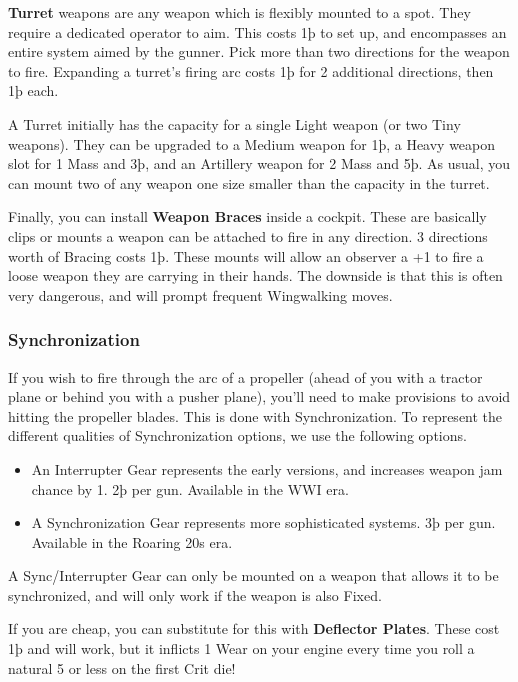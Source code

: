 \documentclass{article}
\begin{document}
\textbf{Turret}{ weapons are any weapon which is flexibly
  mounted to a spot. They require a dedicated operator to aim. This costs
  1þ to set up, and encompasses an entire system aimed by the gunner. Pick
  more than two directions for the weapon to fire. Expanding a turret's
  firing arc costs 1þ for 2 additional directions, then 1þ each.}

A Turret initially has the capacity for a single Light weapon (or
two Tiny weapons). They can be upgraded to a Medium weapon for 1þ, a
Heavy weapon slot for 1 Mass and 3þ, and an Artillery weapon for 2 Mass
and 5þ. As usual, you can mount two of any weapon one size smaller than
the capacity in the turret.

Finally, you can install \textbf{Weapon Braces}
inside a cockpit. These are basically clips or mounts a weapon can be
attached to fire in any direction. 3 directions worth of Bracing costs
1þ. These mounts will allow an observer a +1 to fire a loose weapon they
are carrying in their hands. The downside is that this is often very
dangerous, and will prompt frequent Wingwalking moves.

\subsubsection{Synchronization}
\label{_Synchronization}

If you wish to fire through the arc of a propeller (ahead of you with a
tractor plane or behind you with a pusher plane), you'll need to make
provisions to avoid hitting the propeller blades. This is done with
Synchronization. To represent the different qualities of Synchronization
options, we use the following options.

\begin{itemize}
  \item          An Interrupter Gear represents the early versions, and
        increases weapon jam chance by 1. 2þ per gun. Available in the WWI
        era.
  \item          A Synchronization Gear represents more sophisticated systems.
        3þ per gun. Available in the Roaring 20s era.
\end{itemize}

A Sync/Interrupter Gear can only be mounted on a weapon that allows it
to be synchronized, and will only work if the weapon is also Fixed.

If you are cheap, you can substitute for this with \textbf{Deflector
  Plates}. These cost 1þ and will work, but it inflicts 1 Wear on your
engine every time you roll a natural 5 or less on the first Crit die!
\end{document}
